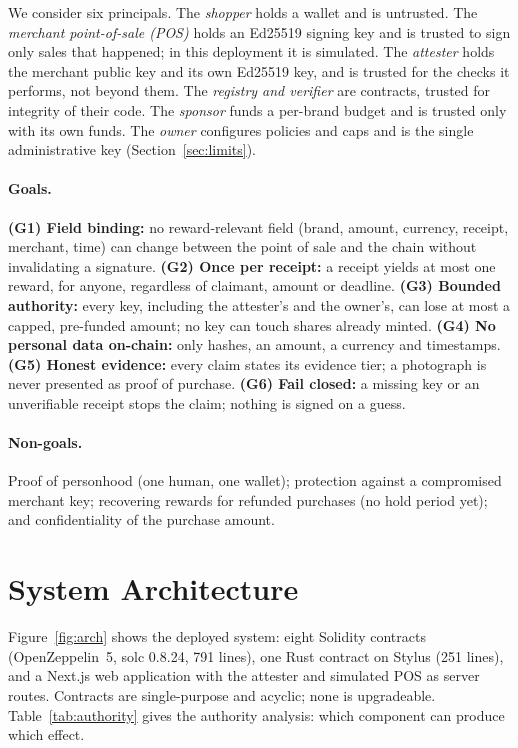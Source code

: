 \documentclass[10.5pt,letterpaper]{article}
\theoremstyle{definition}
\theoremstyle{remark}
\begin{document}
We consider six principals. The \emph{shopper} holds a wallet and is untrusted. The \emph{merchant point-of-sale (POS)}
holds an Ed25519 signing key and is trusted to sign only sales that happened; in this deployment it is simulated.
The \emph{attester} holds the merchant public key and its own Ed25519 key, and is trusted for the checks it performs,
not beyond them. The \emph{registry and verifier} are contracts, trusted for integrity of their code. The
\emph{sponsor} funds a per-brand budget and is trusted only with its own funds. The \emph{owner} configures policies and
caps and is the single administrative key (Section~\ref{sec:limits}).

\paragraph{Goals.}
\textbf{(G1) Field binding:} no reward-relevant field (brand, amount, currency, receipt, merchant, time) can change
between the point of sale and the chain without invalidating a signature.
\textbf{(G2) Once per receipt:} a receipt yields at most one reward, for anyone, regardless of claimant, amount or deadline.
\textbf{(G3) Bounded authority:} every key, including the attester's and the owner's, can lose at most a capped,
pre-funded amount; no key can touch shares already minted.
\textbf{(G4) No personal data on-chain:} only hashes, an amount, a currency and timestamps.
\textbf{(G5) Honest evidence:} every claim states its evidence tier; a photograph is never presented as proof of purchase.
\textbf{(G6) Fail closed:} a missing key or an unverifiable receipt stops the claim; nothing is signed on a guess.

\paragraph{Non-goals.} Proof of personhood (one human, one wallet); protection against a compromised merchant key;
recovering rewards for refunded purchases (no hold period yet); and confidentiality of the purchase amount.

\section{System Architecture}\label{sec:arch}



Figure~\ref{fig:arch} shows the deployed system: eight Solidity contracts (OpenZeppelin~5, solc 0.8.24, 791 lines),
one Rust contract on Stylus (251 lines), and a Next.js web application with the attester and simulated POS as
server routes. Contracts are single-purpose and acyclic; none is upgradeable. Table~\ref{tab:authority} gives the
authority analysis: which component can produce which effect.
\end{document}
